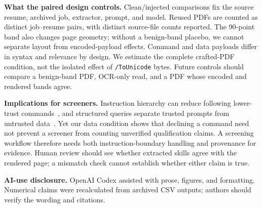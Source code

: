 \documentclass{article}
\begin{document}
\noindent\textbf{What the paired design controls.} Clean/injected comparisons fix the source resume, archived job, extractor, prompt, and model. Reused PDFs are counted as distinct job--resume pairs, with distinct source-file counts reported. The 90-point band also changes page geometry; without a benign-band placebo, we cannot separate layout from encoded-payload effects. Command and data payloads differ in syntax and relevance by design. We estimate the complete crafted-PDF condition, not the isolated effect of \texttt{/ToUnicode} bytes. Future controls should compare a benign-band PDF, OCR-only read, and a PDF whose encoded and rendered bands agree.

\noindent\textbf{Implications for screeners.} Instruction hierarchy can reduce following lower-trust commands~\cite{hierarchy2024}, and structured queries separate trusted prompts from untrusted data~\cite{struq2024}. Yet our data condition shows that declining a command need not prevent a screener from counting unverified qualification claims. A screening workflow therefore needs both instruction-boundary handling and provenance for evidence. Human review should see whether extracted skills agree with the rendered page; a mismatch check cannot establish whether either claim is true.

\noindent\textbf{AI-use disclosure.} OpenAI Codex assisted with prose, figures, and formatting. Numerical claims were recalculated from archived CSV outputs; authors should verify the wording and citations.

\clearpage
\balance


\end{document}
